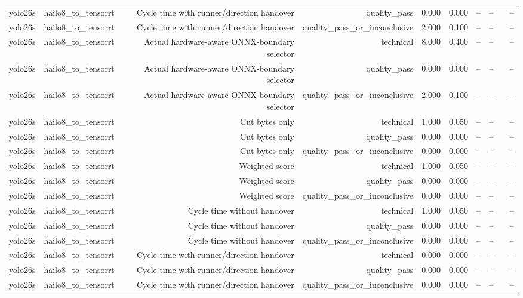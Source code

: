 \begin{table}[t]
\begin{tabular}{lrrrrrrrrr}
yolo26s & hailo8\_to\_tensorrt & Cycle time with runner/direction handover & quality\_pass & 0.000 & 0.000 & -- & -- &  & -- \\
yolo26s & hailo8\_to\_tensorrt & Cycle time with runner/direction handover & quality\_pass\_or\_inconclusive & 2.000 & 0.100 & -- & -- &  & -- \\
yolo26s & hailo8\_to\_tensorrt & Actual hardware-aware ONNX-boundary selector & technical & 8.000 & 0.400 & -- & -- &  & -- \\
yolo26s & hailo8\_to\_tensorrt & Actual hardware-aware ONNX-boundary selector & quality\_pass & 0.000 & 0.000 & -- & -- &  & -- \\
yolo26s & hailo8\_to\_tensorrt & Actual hardware-aware ONNX-boundary selector & quality\_pass\_or\_inconclusive & 2.000 & 0.100 & -- & -- &  & -- \\
yolo26s & hailo8\_to\_tensorrt & Cut bytes only & technical & 1.000 & 0.050 & -- & -- &  & -- \\
yolo26s & hailo8\_to\_tensorrt & Cut bytes only & quality\_pass & 0.000 & 0.000 & -- & -- &  & -- \\
yolo26s & hailo8\_to\_tensorrt & Cut bytes only & quality\_pass\_or\_inconclusive & 0.000 & 0.000 & -- & -- &  & -- \\
yolo26s & hailo8\_to\_tensorrt & Weighted score & technical & 1.000 & 0.050 & -- & -- &  & -- \\
yolo26s & hailo8\_to\_tensorrt & Weighted score & quality\_pass & 0.000 & 0.000 & -- & -- &  & -- \\
yolo26s & hailo8\_to\_tensorrt & Weighted score & quality\_pass\_or\_inconclusive & 0.000 & 0.000 & -- & -- &  & -- \\
yolo26s & hailo8\_to\_tensorrt & Cycle time without handover & technical & 1.000 & 0.050 & -- & -- &  & -- \\
yolo26s & hailo8\_to\_tensorrt & Cycle time without handover & quality\_pass & 0.000 & 0.000 & -- & -- &  & -- \\
yolo26s & hailo8\_to\_tensorrt & Cycle time without handover & quality\_pass\_or\_inconclusive & 0.000 & 0.000 & -- & -- &  & -- \\
yolo26s & hailo8\_to\_tensorrt & Cycle time with runner/direction handover & technical & 0.000 & 0.000 & -- & -- &  & -- \\
yolo26s & hailo8\_to\_tensorrt & Cycle time with runner/direction handover & quality\_pass & 0.000 & 0.000 & -- & -- &  & -- \\
yolo26s & hailo8\_to\_tensorrt & Cycle time with runner/direction handover & quality\_pass\_or\_inconclusive & 0.000 & 0.000 & -- & -- &  & -- \\

\end{tabular}
\end{table}
